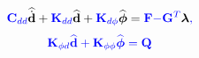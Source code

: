 \documentclass[materials,article,submit,moreauthors,pdftex]{Definitions/mdpi}
\providecommand{\DIFadd}[1]{{\protect\color{blue}{#1}}} %
\providecommand{\DIFaddbegin}{} %
\providecommand{\DIFaddend}{} %
\providecommand{\DIFdelbegin}{} %
\providecommand{\DIFdelend}{} %
\begin{document}
\begin{eqnarray}
\DIFdelend \DIFaddbegin \textbf{\DIFadd{C}}\DIFadd{_{dd} }\widehat{\dot{\textbf{d}}} \DIFaddend + \DIFdelbegin %
\DIFdelend \DIFaddbegin \textbf{\DIFadd{K}}\DIFadd{_{dd} }\widehat{\textbf{d}} \DIFaddend + \DIFdelbegin %
\DIFdelend \DIFaddbegin \textbf{\DIFadd{K}}\DIFadd{_{d\phi} }\widehat{\boldsymbol{\phi}} \DIFaddend = \DIFdelbegin %
\DIFdelend \DIFaddbegin \textbf{\DIFadd{F}} \DIFadd{- }\textbf{\DIFadd{G}}\DIFadd{^T }\boldsymbol{\lambda}\DIFadd{,
}\DIFaddend \label{eq:motion}
\end{eqnarray}
\DIFaddbegin \begin{eqnarray}
\DIFadd{\textbf{K}_{\phi d}\widehat{\textbf{d}} + \textbf{K}_{\phi \phi} \widehat{\boldsymbol{\phi}} = \textbf{Q}
\label{eq:piezocoupling}
}\end{eqnarray} 
\end{document}
